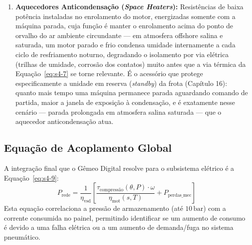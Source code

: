 \documentclass[12pt,a4paper]{article}
\numberwithin{equation}{section}
\numberwithin{table}{section}
\numberwithin{figure}{section}
\begin{document}
\begin{enumerate}
\begin{itemize}
			\item \textbf{Mitigação (acessórios):} Rolamento isolado eletricamente no lado oposto ao acoplamento (\textit{Non-Drive End}), anel de aterramento de eixo (\textit{shaft grounding ring}) que oferece um caminho de descarga de baixa impedância alternativo ao rolamento, e filtro de modo comum na saída do VSD.
		\end{itemize}
		\item \textbf{Aquecedores Anticondensação (\textit{Space Heaters}):} Resistências de baixa potência instaladas no enrolamento do motor, energizadas somente com a máquina parada, cuja função é manter o enrolamento acima do ponto de orvalho do ar ambiente circundante — em atmosfera offshore salina e saturada, um motor parado e frio condensa umidade internamente a cada ciclo de resfriamento noturno, degradando o isolamento por via elétrica (trilhas de umidade, corrosão dos contatos) muito antes que a via térmica da Equação~\eqref{eq:s4-7} se torne relevante. É o acessório que protege especificamente a unidade em reserva (\textit{standby}) da frota (Capítulo 16): quanto mais tempo uma máquina permanece parada aguardando comando de partida, maior a janela de exposição à condensação, e é exatamente nesse cenário — parada prolongada em atmosfera salina saturada — que o aquecedor anticondensação atua.
	\end{enumerate}

	\subsection{\textbf{Equação de Acoplamento Global}}
	A integração final que o Gêmeo Digital resolve para o subsistema elétrico é a Equação~\eqref{eq:s4-9}:
	\begin{equation}\label{eq:s4-9}
 P_{\text{rede}} = \frac{1}{\eta_{\text{vsd}}} \left[ \frac{\tau_{\text{compressão}}(\theta, P) \cdot \omega}{\eta_{\text{mot}}(s, T)} + P_{\text{perdas\_mec}} \right]
\end{equation}
	Esta equação correlaciona a pressão de armazenamento (até $10\,\text{bar}$) com a corrente consumida no painel, permitindo identificar se um aumento de consumo é devido a uma falha elétrica ou a um aumento de demanda/fuga no sistema pneumático.
\end{document}

